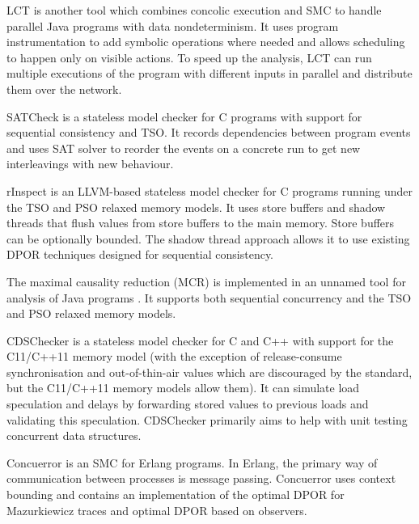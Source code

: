 LCT  is another tool which combines concolic execution and SMC to handle parallel Java programs with data nondeterminism.
It uses program instrumentation to add symbolic operations where needed and allows scheduling to happen only on visible actions.
To speed up the analysis, LCT can run multiple executions of the program with different inputs in parallel and distribute them over the network.

SATCheck  is a stateless model checker for C programs with support for sequential consistency and TSO.
It records dependencies between program events and uses SAT solver to reorder the events on a concrete run to get new interleavings with new behaviour.

rInspect  is an LLVM-based stateless model checker for C
programs running under the TSO and PSO relaxed memory models.
It uses store buffers and shadow threads that flush values from store buffers
to the main memory.
Store buffers can be optionally bounded.
The shadow thread approach allows it to use existing DPOR techniques designed
for sequential consistency.

The maximal causality reduction (MCR) is implemented in an unnamed tool for analysis of Java programs .
It supports both sequential concurrency and the TSO and PSO relaxed memory models.

CDSChecker  is a stateless model checker for C and C++ with support for the C11/C++11 memory model (with the exception of release-consume synchronisation and out-of-thin-air values which are discouraged by the standard, but the C11/C++11 memory models allow them).
It can simulate load speculation and delays by forwarding stored values to previous loads and validating this speculation.
CDSChecker primarily aims to help with unit testing concurrent data structures.

Concuerror  is an SMC for Erlang programs.
In Erlang, the primary way of communication between processes is message passing.
Concuerror uses context bounding and contains an implementation of the optimal DPOR for Mazurkiewicz traces and optimal DPOR based on observers.

